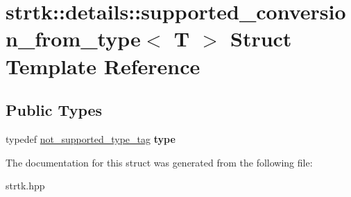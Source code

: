\hypertarget{structstrtk_1_1details_1_1supported__conversion__from__type}{\section{strtk\-:\-:details\-:\-:supported\-\_\-conversion\-\_\-from\-\_\-type$<$ T $>$ Struct Template Reference}
\label{structstrtk_1_1details_1_1supported__conversion__from__type}
}
\subsection*{Public Types}
\begin{DoxyCompactItemize}
\item 
\hypertarget{structstrtk_1_1details_1_1supported__conversion__from__type_af2407d03a45e380db107d09a5d6e3e53}{typedef \hyperlink{structstrtk_1_1details_1_1not__supported__type__tag}{not\-\_\-supported\-\_\-type\-\_\-tag} {\bfseries type}}\label{structstrtk_1_1details_1_1supported__conversion__from__type_af2407d03a45e380db107d09a5d6e3e53}

\end{DoxyCompactItemize}


The documentation for this struct was generated from the following file\-:\begin{DoxyCompactItemize}
\item 
strtk.\-hpp\end{DoxyCompactItemize}
